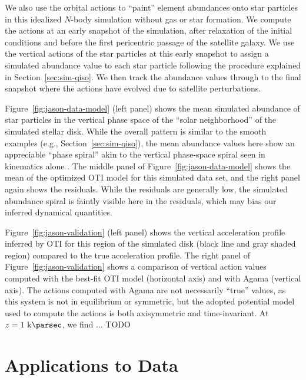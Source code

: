 We also use the orbital actions to ``paint'' element abundances onto star particles in
this idealized $N$-body simulation without gas or star formation.
We compute the actions at an early snapshot of the simulation, after relaxation of the
initial conditions and before the first pericentric passage of the satellite galaxy.
We use the vertical actions of the star particles at this early snapshot to assign a
simulated  abundance value to each star particle following the procedure
explained in Section~\ref{sec:sim-qiso}.
We then track the abundance values through to the final snapshot where the actions have
evolved due to satellite perturbations.

Figure~\ref{fig:jason-data-model} (left panel) shows the mean simulated 
abundance of star particles in the vertical phase space of the ``solar neighborhood'' of
the simulated stellar disk.
While the overall pattern is similar to the smooth examples (e.g.,
Section~\ref{sec:sim-qiso}), the mean abundance values here show an appreciable ``phase
spiral'' akin to the vertical phase-space spiral seen in kinematics alone
\citep{Antoja:2018}.
The middle panel of Figure~\ref{fig:jason-data-model} shows the mean  of
the optimized OTI model for this simulated data set, and the right panel again shows the
residuals.
While the residuals are generally low, the simulated abundance spiral is faintly visible
here in the residuals, which may bias our inferred dynamical quantities.

Figure~\ref{fig:jason-validation} (left panel) shows the vertical acceleration profile
inferred by OTI for this region of the simulated disk (black line and gray shaded
region) compared to the true acceleration profile.
The right panel of Figure~\ref{fig:jason-validation} shows a comparison of vertical
action values computed with the best-fit OTI model (horizontal axis) and with Agama
(vertical axis).
The actions computed with Agama are not necessarily ``true'' values, as this system is
not in equilibrium or symmetric, but the adopted potential model used to compute the
actions is both axisymmetric and time-invariant.
At $z=1~\kpc$, we find ... TODO




\section{Applications to Data} \label{sec:applications-data}

